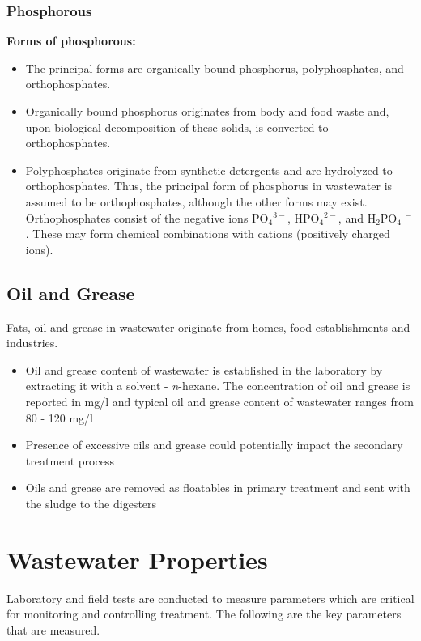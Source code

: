 		\subsubsection{Phosphorous}			
		\textbf{Forms of phosphorous:}\\
					      \begin{itemize}
					      	\item The principal forms are organically bound phosphorus, polyphosphates, and orthophosphates.
					      	\item Organically bound phosphorus originates from body and food waste and, upon biological decomposition of these solids, is converted to orthophosphates. 
					      	\item Polyphosphates originate from synthetic detergents and are hydrolyzed to orthophosphates. Thus, the principal form of phosphorus in wastewater is assumed to be orthophosphates, although the other forms may exist. Orthophosphates consist of the negative ions PO$_4$$^{3-}$, HPO$_4$$^{2-}$, and H$_2$PO$_4$ $^-$.  These may form chemical combinations with cations (positively charged ions).
					      \end{itemize}

\subsection{Oil and Grease}	
			Fats, oil and grease in wastewater originate from homes, food establishments and industries.
			\begin{itemize}
				\item Oil and grease content of wastewater is established in the laboratory by extracting it with a solvent - \textit{n}-hexane.  The concentration of oil and grease is reported in mg/l and typical oil and grease content of wastewater ranges from 80 - 120 mg/l
				\item Presence of excessive oils and grease could potentially impact the secondary treatment process
				\item Oils and grease are removed as floatables in primary treatment and sent with the sludge to the digesters
			\end{itemize}
		



\section{Wastewater Properties}			
		Laboratory and field tests are conducted to measure parameters which are critical for monitoring and controlling treatment.  The following are the key parameters that are measured.	
			

